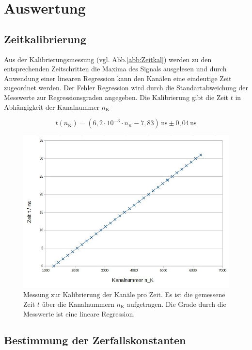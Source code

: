 \documentclass[numbers=noenddot,a4paper]{scrartcl}
\begin{document}
	\newpage

\section{Auswertung}

\subsection{Zeitkalibrierung}

Aus der Kalibrierungsmessung (vgl. Abb.\eqref{abb:Zeitkal}) werden zu den entsprechenden Zeitschritten die Maxima des Signals ausgelesen und durch Anwendung einer linearen Regression kann den Kanälen eine eindeutige Zeit zugeordnet werden. Der Fehler Regression wird durch die Standartabweichung der Messwerte zur Regressionsgraden angegeben. Die Kalibrierung gibt die Zeit $t$ in Abhängigkeit der Kanalnummer $n_\textrm{K}$

\begin{equation}
t(n_\textrm{K}) = (6,2\cdot 10^{-3}\cdot n_\textrm{K} - 7,83) \,\mathrm{ns} \pm 0,04\,\mathrm{ns}\label{eq:Zeitkal}
\end{equation}

\begin{figure}[!h]
	\centering
	\includegraphics[width=0.7\columnwidth]{Zeitkal}
	\caption{Messung zur Kalibrierung der Kanäle pro Zeit. Es ist die gemessene Zeit $t$ über die Kanalnummern $n_\textrm{K}$ aufgetragen. Die Grade durch die Messwerte ist eine lineare Regression.}
	\label{abb:Zeitkal}
\end{figure}
\newpage
\subsection{Bestimmung der Zerfallskonstanten}
\end{document}
